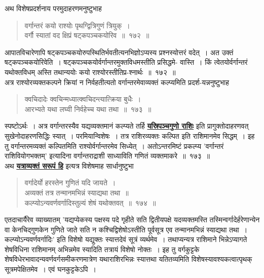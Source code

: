 \documentclass[11pt, openany]{book}
\begin{document}
\vspace{-2mm}
 अथ विशेषप्रदर्शनाय परमुदाहरणमनुष्टुभाह\textendash
\begin{quote}
    \eg 
     वर्गान्तरं कयो राश्योः पृथग्द्वित्रिगुणं त्रियुक्~। \\
 वर्गौ स्यातां वद क्षिप्रं षट्कपञ्चकयोरिव~॥~१७२~॥~
\end{quote}
 
 आपातविचारेणापि षट्कपञ्चकयोरुपस्थितिर्भवतीत्यनभिज्ञोऽप्यस्य
प्रश्नस्योत्तरं वदेत्~। अत उक्तं षट्कपञ्चकयोरिवेति~। षट्कपञ्चकयोर्वर्गान्तरमुक्तविधमस्तीति प्रसिद्धमे-
\newpage
\noindent वास्ति~। किं त्वेतयोर्वर्गान्तरं यथोक्तविधम् अस्ति तथान्ययोः कयो
राश्योरस्तीतिप्र-श्नार्थः~॥~१७२~॥~\\

\vspace{-2mm}
 अत्र राश्योरव्यक्तकल्पने क्रियां न निर्वहतीत्यतो वर्गान्तरमेवाव्यक्तं
कल्प्यमिति प्रदर्श-यन्ननुष्टुभाह\textendash
\begin{quote}
    \ab 
     क्वचिदादेः क्वचिन्मध्यात्क्वचिदन्त्यात्क्रिया बुधैः~। \\
 आरभ्यते यथा लघ्वी निर्वहेच्च यथा तथा~॥~१७३~॥~
\end{quote}

 स्पष्टोऽर्थः~। अत्र वर्गान्तरस्यैव यद्यव्यक्तमानं कल्प्यते तर्हि \hyperref[170]{\textbf{यस्रिपञ्चगुणो राशिः}} इति प्रागुक्तोदाहरणवत् सुखेनोदाहरणसिद्धिः स्यात्~। परमियान्विशेषः~। तत्र
राशिरव्यक्तः कल्पित इति राशिमानमेव सिद्धम्~। इह तु वर्गान्तरमव्यक्तं
कल्पितमिति राश्योर्वर्गान्तरमेव सिध्येत्~। अतोऽन्तरमिष्टं प्रकल्प्य {\qt 'वर्गान्तरं राशिवियोगभक्तम्'} इत्यादिना वर्गान्तराद्राशी साध्याविति गणितं व्यक्तमाकरे~॥~१७३~॥\\

\vspace{-2mm}
 अथ \hyperref[169]{\textbf{यत्राव्यक्तं सरूपं हि}} इत्यत्र विशेषमाह सार्धानुष्टुभा\textendash
 
 \label{174}
\begin{quote}
    \ab
     वर्गादेर्यो हरस्तेन गुणितं यदि जायते~। \\
 अव्यक्तं तत्र तन्मानमभिन्नं स्याद्यथा तथा~॥~\\
 कल्प्योऽन्यवर्णवर्गादिस्तुल्यं शेषं यथोक्तवत्~॥~१७४~॥
\end{quote}

एतदाचार्यैरेव व्याख्यातम् {\qt 'यद्यप्येकस्य पक्षस्य पदे गृहीते सति
द्वितीयपक्षे यदव्यक्तमस्ति तस्मिन्वर्गादेर्हरेणान्येन वा केनचिद्गुणकेन गुणिते जाते
सति न कश्चिद्विशेषोऽस्तीति पूर्वसूत्र एव तन्मानमभिन्नं स्याद्यथा तथा~।
कल्प्योऽन्यवर्णवर्गादिः'} इति विशेषो यद्युक्तः स्यात्तदेवं सूत्रं व्यर्थमेव~। तथाप्यन्यत्र
राशिमाने भिन्नेऽप्यागते
शेषविधिना राशिमानम् अभिन्नमेव स्यादिति तत्रायं विशेषो नोक्तः~। इह तु
वर्गकुट्टके शेषविधेरभावादन्यवर्णवर्गसमीकरणमात्रेण यथाराशिरभिन्नः स्यात्तथा
यतितव्यमिति विशेषस्यावश्यकत्वात्पृथक् सूत्रमपेक्षितमेव~। एवं घनकुट्टकेऽपि~। \\
\end{document}
